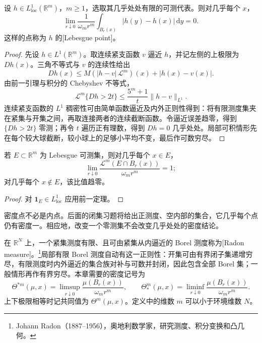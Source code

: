 \begin{theorem}\label{g3:thm:lebesgue-differentiation}
	设 \(h\in L^1_{\mathrm{loc}}(\mathbb R^m)\)，\(m\ge1\)，选取其几乎处处有限的可测代表。则对几乎每个 \(x\)，
	\[
		\lim_{r\downarrow0}\frac1{\omega_mr^m}
		\int_{B_r(x)}|h(y)-h(x)|\,\mathrm dy=0.
	\]
	这样的点称为 \(h\) 的[Lebesgue point]。
\end{theorem}
\begin{proof}
	先设 \(h\in L^1(\mathbb R^m)\)。取连续紧支函数 \(v\) 逼近 \(h\)，并记左侧的上极限为 \(D h(x)\)。三角不等式与 \(v\) 的连续性给出
	\[
		D h(x)\le M(|h-v|\,\mathcal L^m)(x)+|h(x)-v(x)|.
	\]
	由前一引理与积分的 Chebyshev 不等式，
	\[
		\mathcal L^m\{D h>2t\}
		\le\frac{5^m+1}{t}\|h-v\|_{L^1}.
	\]
	连续紧支函数的 \(L^1\) 稠密性可由简单函数逼近及内外正则性得到：将有限测度集夹在紧集与开集之间，再取连接两者的连续截断函数。令逼近误差趋零，得到 \(\{D h>2t\}\) 零测；再令 \(t\) 遍历正有理数，得到 \(D h=0\) 几乎处处。局部可积情形先在每个较大球截断，较小球上的足够小平均不变，最后作可数穷尽。
\end{proof}

\begin{corollary}\label{g3:cor:lebesgue-density}
	若 \(E\subset\mathbb R^m\) 为 Lebesgue 可测集，则对几乎每个 \(x\in E\)，
	\[
		\lim_{r\downarrow0}\frac{\mathcal L^m(E\cap B_r(x))}{\omega_mr^m}=1;
	\]
	对几乎每个 \(x\notin E\)，该比值趋零。
\end{corollary}
\begin{proof}
	对 \(\mathbf1_E\in L^1_{\mathrm{loc}}\) 应用前一定理。
\end{proof}

密度点不必是内点。后面的闭集习题将给出正测度、空内部的集合，它几乎每个点仍有密度一。相应地，改变一个零测集不会改变几乎处处的密度结论。

\ProseParagraphBreak

在 \(\mathbb R^N\) 上，一个紧集测度有限、且可由紧集从内逼近的 Borel 测度称为[Radon measure]。\footnote{Johann Radon（1887--1956），奥地利数学家，研究测度、积分变换和凸几何。}局部有限 Borel 测度自动有这一正则性：开集可由有界闭子集递增穷尽，有限测度时内外逼近的集合族对补与可数并封闭，因此包含全部 Borel 集；一般情形再作有界穷尽。本章需要的密度记号为
\[
	\Theta^{*m}(\mu,x)=\limsup_{r\downarrow0}\frac{\mu(B_r(x))}{\omega_mr^m},
	\qquad
	\Theta_*^m(\mu,x)=\liminf_{r\downarrow0}\frac{\mu(B_r(x))}{\omega_mr^m}.
\]
上下极限相等时记共同值为 \(\Theta^m(\mu,x)\)。定义中的维数 \(m\) 可以小于环境维数 \(N\)。

